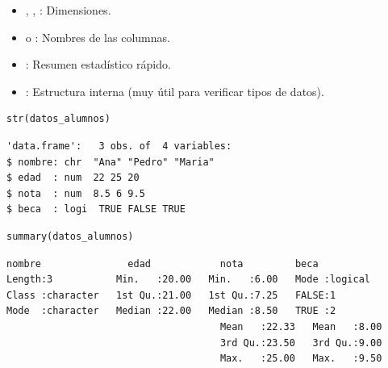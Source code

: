 \documentclass[8pt]{beamer}
\begin{document}
\begin{frame}[fragile]
\begin{itemize}
	\item {}, , : Dimensiones.
	\item {} o : Nombres de las columnas.
	\item {}: Resumen estadístico rápido.
	\item {}: Estructura interna (muy útil para verificar tipos de datos).
\end{itemize}

\begin{lstlisting}[style=RScript]
str(datos_alumnos)
\end{lstlisting}
\begin{lstlisting}[style=RConsole]
'data.frame':	3 obs. of  4 variables:
$ nombre: chr  "Ana" "Pedro" "Maria"
$ edad  : num  22 25 20
$ nota  : num  8.5 6 9.5
$ beca  : logi  TRUE FALSE TRUE
\end{lstlisting}
\begin{lstlisting}[style=RScript]
summary(datos_alumnos)
\end{lstlisting}
\begin{lstlisting}[style=RConsole]
    nombre               edad            nota         beca        
Length:3           Min.   :20.00   Min.   :6.00   Mode :logical  
Class :character   1st Qu.:21.00   1st Qu.:7.25   FALSE:1        
Mode  :character   Median :22.00   Median :8.50   TRUE :2        
									 Mean   :22.33   Mean   :8.00                  
									 3rd Qu.:23.50   3rd Qu.:9.00                  
									 Max.   :25.00   Max.   :9.50  
\end{lstlisting}
\end{frame}
\end{document}
